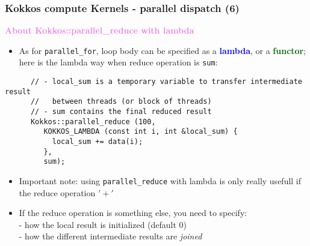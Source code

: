 \begin{frame}[fragile=singleslide]
  \frametitle{Kokkos compute Kernels - parallel dispatch (6)}

  {\large \textcolor{violet}{\textbf{About Kokkos::parallel\_reduce with lambda}}}

  \begin{itemize}
  \item As for \texttt{parallel\_for}, loop body can be specified as a \textcolor{blue}{\bf lambda}, or a \textcolor{darkgreen}{\bf functor}; here is the lambda way when reduce operation is \texttt{sum}:
  \end{itemize}
  {\small
    \begin{verbatim}
      // - local_sum is a temporary variable to transfer intermediate result
      //   between threads (or block of threads)
      // - sum contains the final reduced result
      Kokkos::parallel_reduce (100,
         KOKKOS_LAMBDA (const int i, int &local_sum) {
           local_sum += data(i);
         },
         sum);
       \end{verbatim}
       \begin{itemize}
       \item Important note: using \texttt{parallel\_reduce} with lambda is only really usefull if the reduce operation $'+'$
       \item If the reduce operation is something else, you need to specify:\\
         - how the local result is initialized (default 0)\\
         - how the different intermediate results are {\it joined}
       \end{itemize}
  }

\end{frame}

